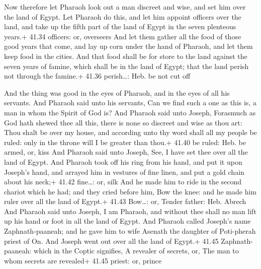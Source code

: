  Now therefore let Pharaoh look out a man discreet and
wise, and set him over the land of Egypt.  Let Pharaoh do
this, and let him appoint officers over the land, and take up the fifth
part of the land of Egypt in the seven plenteous years.+ 41.34 officers:
or, overseers  And let them gather all the food of those
good years that come, and lay up corn under the hand of Pharaoh, and let
them keep food in the cities.  And that food shall be for
store to the land against the seven years of famine, which shall be in
the land of Egypt; that the land perish not through the famine.+ 41.36
perish\ldots: Heb. be not cut off

 And the thing was good in the eyes of Pharaoh, and in
the eyes of all his servants.  And Pharaoh said unto his
servants, Can we find such a one as this is, a man in whom the Spirit of
God is?  And Pharaoh said unto Joseph, Forasmuch as God
hath shewed thee all this, there is none so discreet and wise as thou
art:  Thou shalt be over my house, and according unto thy
word shall all my people be ruled: only in the throne will I be greater
than thou.+ 41.40 be ruled: Heb. be armed, or, kiss  And
Pharaoh said unto Joseph, See, I have set thee over all the land of
Egypt.  And Pharaoh took off his ring from his hand, and
put it upon Joseph's hand, and arrayed him in vestures of fine linen,
and put a gold chain about his neck;+ 41.42 fine\ldots: or, silk
 And he made him to ride in the second chariot which he
had; and they cried before him, Bow the knee: and he made him ruler over
all the land of Egypt.+ 41.43 Bow\ldots: or, Tender father: Heb. Abrech
 And Pharaoh said unto Joseph, I am Pharaoh, and without
thee shall no man lift up his hand or foot in all the land of Egypt.
 And Pharaoh called Joseph's name Zaphnath-paaneah; and he
gave him to wife Asenath the daughter of Poti-pherah priest of On. And
Joseph went out over all the land of Egypt.+ 41.45 Zaphnath-paaneah:
which in the Coptic signifies, A revealer of secrets, or, The man to
whom secrets are revealed+ 41.45 priest: or, prince

